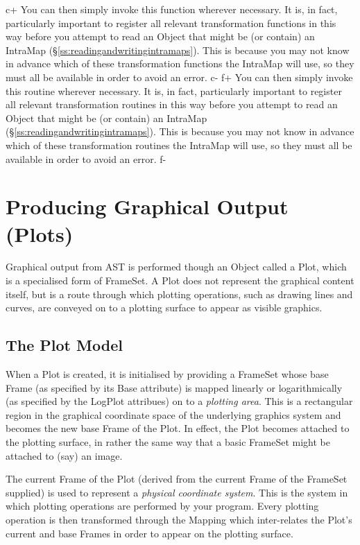\documentclass[twoside,11pt]{starlink}
\providecommand{\secref}[1]{\S\ref{#1}}
\begin{document}
c+
You can then simply invoke this function wherever necessary. It is, in
fact, particularly important to register all relevant transformation
functions in this way before you attempt to read an Object that might
be (or contain) an IntraMap
(\secref{ss:readingandwritingintramaps}). This is because you may not
know in advance which of these transformation functions the IntraMap
will use, so they must all be available in order to avoid an error.
c-
f+
You can then simply invoke this routine wherever necessary. It is, in
fact, particularly important to register all relevant transformation
routines in this way before you attempt to read an Object that might
be (or contain) an IntraMap
(\secref{ss:readingandwritingintramaps}). This is because you may not
know in advance which of these transformation routines the IntraMap
will use, so they must all be available in order to avoid an error.
f-

\cleardoublepage
\section{\label{ss:plots}Producing Graphical Output (Plots)}

Graphical output from AST is performed though an Object called a Plot,
which is a specialised form of FrameSet. A Plot does not represent the
graphical content itself, but is a route through which plotting
operations, such as drawing lines and curves, are conveyed on to a
plotting surface to appear as visible graphics.

\subsection{The Plot Model}

When a Plot is created, it is initialised by providing a FrameSet whose
base Frame (as specified by its Base attribute) is mapped linearly or
logarithmically (as specified by the LogPlot attribues) on to a
\emph{plotting area}. This is a rectangular region in the graphical
coordinate space of the underlying graphics system and becomes the new
base Frame of the Plot. In effect, the Plot becomes attached to the
plotting surface, in rather the same way that a basic FrameSet might be
attached to (say) an image.

The current Frame of the Plot (derived from the current Frame of the
FrameSet supplied) is used to represent a \emph{physical coordinate
system}. This is the system in which plotting operations are
performed by your program.  Every plotting operation is then
transformed through the Mapping which inter-relates the Plot's current
and base Frames in order to appear on the plotting surface.
\end{document}
